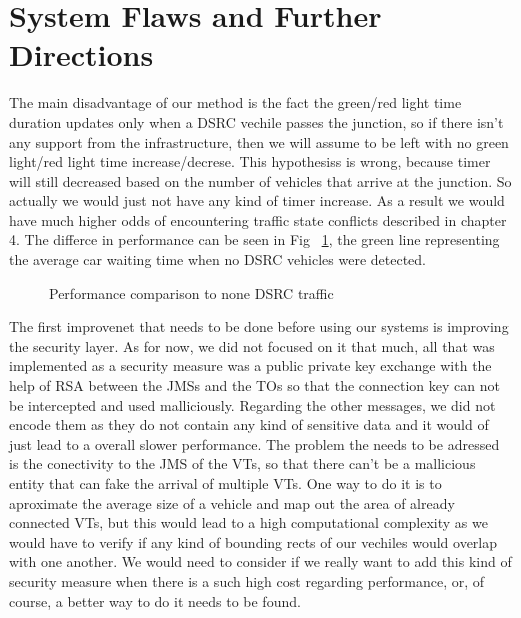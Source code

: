 \documentclass[17pt]{report}
\begin{document}
\section{System Flaws and Further Directions}
\indent \indent
The main disadvantage of our method is the fact the
green/red light time duration updates only when a DSRC vechile
passes the junction, so if there isn't any support from the infrastructure,
then we will assume to be left with no green light/red light time increase/decrese.
This hypothesiss is wrong, because timer will still decreased 
based on the number of vehicles that arrive at the junction. So actually
we would just not have any kind of timer increase. As a result we would 
have much higher odds of encountering traffic state conflicts described in 
chapter 4. The differce in performance can be seen in Fig 
~\ref{fig:All Optimizer vs no timer duration update}, the green line 
representing the average car waiting time when no DSRC vehicles were 
detected.
\begin{figure}[h!]
    \centering
    \label{fig:All Optimizer vs no timer duration update}
    \caption{Performance comparison to none DSRC traffic}
\end{figure}

\indent 
The first improvenet that needs to be done before using our systems is 
improving the security layer. As for now, we did not focused on it
that much, all that was implemented as a security measure was a 
public private key exchange with the help of RSA between the JMSs 
and the TOs so that the connection key can not be intercepted
and used malliciously. Regarding the other messages, we did not 
encode them as they do not contain any kind of sensitive data and 
it would of just lead to a overall slower performance. The problem  
the needs to be adressed is the conectivity to the JMS of the VTs, so 
that there can't be a mallicious entity that can fake the arrival of
multiple VTs. One way to do it is to aproximate the average size of
a vehicle and map out the area of already connected VTs,
but this would lead to a high computational complexity as we
would have to verify if any kind of bounding rects of our vechiles
would overlap with one another. We would need to consider if we
really want to add this kind of security measure when there is a
such high cost regarding performance, or, of course, a better way
to do it needs to be found. 
\end{document}
